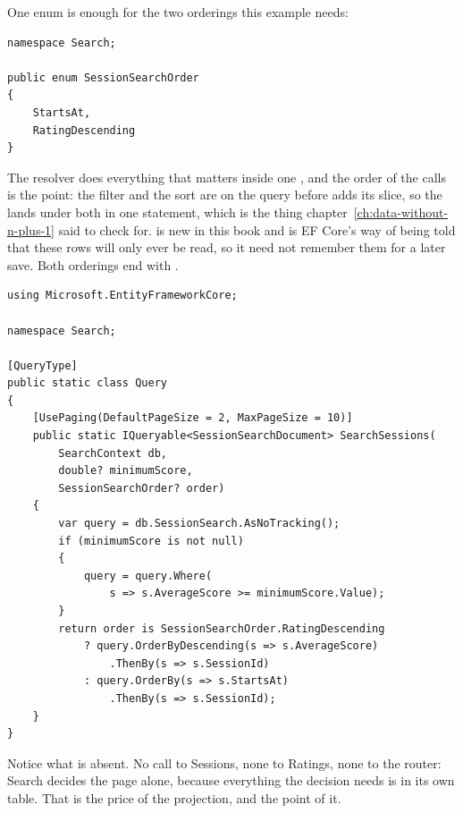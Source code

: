 One enum is enough for the two orderings this example needs:

\begin{verbatim}
namespace Search;

public enum SessionSearchOrder
{
    StartsAt,
    RatingDescending
}
\end{verbatim}

%
The resolver does everything that matters inside one , and
the order of the calls is the point: the filter and the sort are on the query
before \code{[UsePaging]} adds its slice, so the  lands under
both in one statement, which is the thing
chapter~\ref{ch:data-without-n-plus-1} said to check for.
 is new in this book and is EF Core's way of being told
that these rows will only ever be read, so it need not remember them for a
later save. Both orderings end with .

\begin{verbatim}
using Microsoft.EntityFrameworkCore;

namespace Search;

[QueryType]
public static class Query
{
    [UsePaging(DefaultPageSize = 2, MaxPageSize = 10)]
    public static IQueryable<SessionSearchDocument> SearchSessions(
        SearchContext db,
        double? minimumScore,
        SessionSearchOrder? order)
    {
        var query = db.SessionSearch.AsNoTracking();
        if (minimumScore is not null)
        {
            query = query.Where(
                s => s.AverageScore >= minimumScore.Value);
        }
        return order is SessionSearchOrder.RatingDescending
            ? query.OrderByDescending(s => s.AverageScore)
                .ThenBy(s => s.SessionId)
            : query.OrderBy(s => s.StartsAt)
                .ThenBy(s => s.SessionId);
    }
}
\end{verbatim}

Notice what is absent. No call to Sessions, none to Ratings, none to the
router: Search decides the page alone, because everything the decision needs
is in its own table. That is the price of the projection, and the point of it.
%
